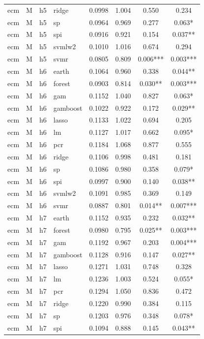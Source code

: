 \begin{ThreePartTable}
\begin{longtable}[t]{llclcccc}
ecm & M & h5 & ridge & 0.0998 & 1.004 & 0.550 & 0.234\\
ecm & M & h5 & sp & 0.0964 & 0.969 & 0.277 & 0.063*\\
ecm & M & h5 & spi & 0.0916 & 0.921 & 0.154 & 0.037**\\
ecm & M & h5 & svmlw2 & 0.1010 & 1.016 & 0.674 & 0.294\\
ecm & M & h5 & svmr & 0.0805 & 0.809 & 0.006*** & 0.003***\\
\addlinespace
ecm & M & h6 & earth & 0.1064 & 0.960 & 0.338 & 0.044**\\
ecm & M & h6 & forest & 0.0903 & 0.814 & 0.030** & 0.003***\\
ecm & M & h6 & gam & 0.1152 & 1.040 & 0.827 & 0.063*\\
ecm & M & h6 & gamboost & 0.1022 & 0.922 & 0.172 & 0.029**\\
ecm & M & h6 & lasso & 0.1133 & 1.022 & 0.694 & 0.205\\
ecm & M & h6 & lm & 0.1127 & 1.017 & 0.662 & 0.095*\\
ecm & M & h6 & pcr & 0.1184 & 1.068 & 0.877 & 0.555\\
ecm & M & h6 & ridge & 0.1106 & 0.998 & 0.481 & 0.181\\
ecm & M & h6 & sp & 0.1086 & 0.980 & 0.358 & 0.079*\\
ecm & M & h6 & spi & 0.0997 & 0.900 & 0.140 & 0.038**\\
ecm & M & h6 & svmlw2 & 0.1091 & 0.985 & 0.369 & 0.149\\
ecm & M & h6 & svmr & 0.0887 & 0.801 & 0.014** & 0.007***\\
\addlinespace
ecm & M & h7 & earth & 0.1152 & 0.935 & 0.232 & 0.032**\\
ecm & M & h7 & forest & 0.0980 & 0.795 & 0.025** & 0.003***\\
ecm & M & h7 & gam & 0.1192 & 0.967 & 0.203 & 0.004***\\
ecm & M & h7 & gamboost & 0.1128 & 0.916 & 0.147 & 0.027**\\
ecm & M & h7 & lasso & 0.1271 & 1.031 & 0.748 & 0.328\\
ecm & M & h7 & lm & 0.1236 & 1.003 & 0.524 & 0.055*\\
ecm & M & h7 & pcr & 0.1294 & 1.050 & 0.836 & 0.472\\
ecm & M & h7 & ridge & 0.1220 & 0.990 & 0.384 & 0.115\\
ecm & M & h7 & sp & 0.1203 & 0.976 & 0.348 & 0.078*\\
ecm & M & h7 & spi & 0.1094 & 0.888 & 0.145 & 0.043**\\

\end{longtable}
\end{ThreePartTable}
